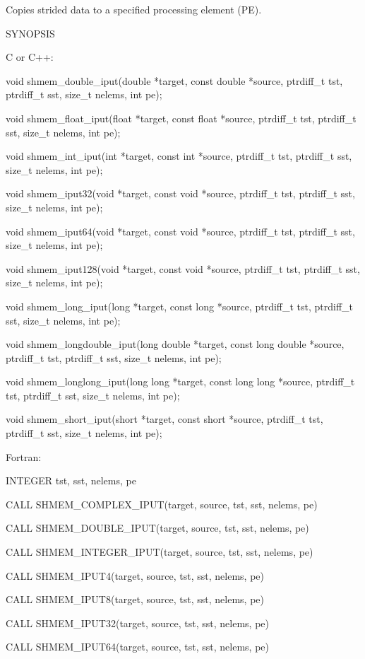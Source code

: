        Copies  strided  data	 to  a specified processing element (PE).

SYNOPSIS

       C or C++:

	  void	shmem_double_iput(double  *target,   const   double   *source,
	  ptrdiff_t tst, ptrdiff_t sst, size_t nelems, int pe);

	  void	shmem_float_iput(float *target, const float *source, ptrdiff_t
	  tst, ptrdiff_t sst, size_t nelems, int pe);

	  void shmem_int_iput(int *target, const int *source,  ptrdiff_t  tst,
	  ptrdiff_t sst, size_t nelems, int pe);

	  void	shmem_iput32(void  *target, const void *source, ptrdiff_t tst,
	  ptrdiff_t sst, size_t nelems, int pe);

	  void shmem_iput64(void *target, const void *source,  ptrdiff_t  tst,
	  ptrdiff_t sst, size_t nelems, int pe);

	  void	shmem_iput128(void *target, const void *source, ptrdiff_t tst,
	  ptrdiff_t sst, size_t nelems, int pe);

	  void shmem_long_iput(long *target,  const  long  *source,  ptrdiff_t
	  tst, ptrdiff_t sst, size_t nelems, int pe);

	  void	shmem_longdouble_iput(long  double  *target, const long double
	  *source, ptrdiff_t tst, ptrdiff_t sst, size_t nelems, int pe);

	  void shmem_longlong_iput(long long *target, const long long *source,
	  ptrdiff_t tst, ptrdiff_t sst, size_t nelems, int pe);

	  void	shmem_short_iput(short *target, const short *source, ptrdiff_t
	  tst, ptrdiff_t sst, size_t nelems, int pe);

       Fortran:

	  INTEGER tst, sst, nelems, pe

	  CALL SHMEM_COMPLEX_IPUT(target, source, tst, sst, nelems, pe)

	  CALL SHMEM_DOUBLE_IPUT(target, source, tst, sst, nelems, pe)

	  CALL SHMEM_INTEGER_IPUT(target, source, tst, sst, nelems, pe)

	  CALL SHMEM_IPUT4(target, source, tst, sst, nelems, pe)

	  CALL SHMEM_IPUT8(target, source, tst, sst, nelems, pe)

	  CALL SHMEM_IPUT32(target, source, tst, sst, nelems, pe)

	  CALL SHMEM_IPUT64(target, source, tst, sst, nelems, pe)

